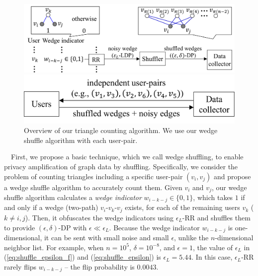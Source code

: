 \begin{figure}[t]
  \centering
  \includegraphics[width=0.99\linewidth]{fig/wedge_shuffle.pdf}
  \vspace{-2mm}
  \caption{Overview of our wedge shuffle algorithm with inputs $v_i$ and $v_j$. 
  }
  \label{fig:wedge_shuffle}
\vspace{2mm}
  \centering
  \includegraphics[width=0.7\linewidth]{fig/triangle_count.pdf}
  \vspace{-2mm}
  \caption{Overview of our triangle counting algorithm. 
  We use our wedge shuffle algorithm with each user-pair.
  }
  \label{fig:triangle_count}
\end{figure}

\smallskip
{}~~First, we propose a basic technique, which we call wedge shuffling, to enable privacy amplification of graph data by shuffling. 
Specifically, we consider the problem of counting triangles including a specific user-pair $(v_i, v_j)$ 
and propose a wedge shuffle algorithm to accurately count them. 
Given $v_i$ and $v_j$, 
our wedge shuffle algorithm calculates a \textit{wedge indicator} $w_{i-k-j} \in \{0,1\}$, which 
takes $1$ if and only if a wedge (two-path) 
$v_i$-$v_k$-$v_j$ 
exists, 
for each of the remaining users $v_k$ ($k \ne i, j$). 
Then, it 
obfuscates the wedge indicators using $\epsilon_L$-RR and shuffles them to provide $(\epsilon, \delta)$-DP with $\epsilon \ll \epsilon_L$. 
Because the wedge indicator $w_{i-k-j}$ is one-dimensional, it can be sent with 
small noise 
and small $\epsilon$, 
unlike the $n$-dimensional neighbor list. 
For example, when $n=10^5$, $\delta=10^{-8}$, and $\epsilon=1$, the value of $\epsilon_L$ in (\ref{eq:shuffle_epsilon_f}) and (\ref{eq:shuffle_epsilon}) is $\epsilon_L = 5.44$. 
In this case, $\epsilon_L$-RR rarely flips $w_{i-k-j}$ -- the flip probability is $0.0043$. 

